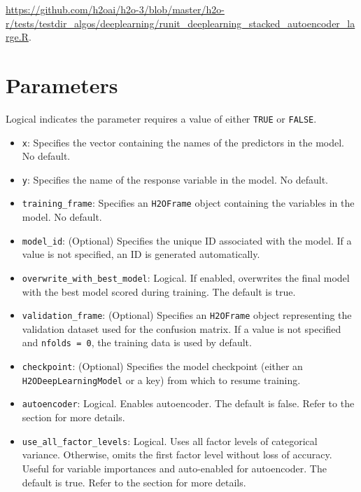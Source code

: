 {{\url{https://github.com/h2oai/h2o-3/blob/master/h2o-r/tests/testdir_algos/deeplearning/runit_deeplearning_stacked_autoencoder_large.R}.


\section{Parameters}
\label{sec:Parameters}

Logical indicates the parameter requires a value of either \texttt{TRUE} or \texttt{FALSE}. 

\begin{itemize}

\item \texttt{x}: Specifies the vector containing the names of the predictors in the model. No default.

\item \texttt{y}: Specifies the name of the response variable in the model. No default.

\item \texttt{training\_frame}: Specifies an \texttt{H2OFrame} object containing the variables in the model.  No default.

\item \texttt{model\_id}: (Optional) Specifies the unique ID associated with the model. If a value is not specified, an ID is generated automatically. 

\item \texttt{overwrite\_with\_best\_model}: Logical. If enabled, overwrites the final model with the best model scored during training. The default is true.

\item \texttt{validation\_frame}: (Optional) Specifies an \texttt{H2OFrame} object representing the validation dataset used for the confusion matrix. If a value is not specified and \texttt{nfolds = 0}, the training data is used by default. 

\item \texttt{checkpoint}: (Optional) Specifies the model checkpoint (either an \\ \texttt{H2ODeepLearningModel} or a key) from which to resume training. 

\item \texttt{autoencoder}: Logical. Enables autoencoder. The default is false. Refer to the {\textbf{}} section for more details.

\item \texttt{use\_all\_factor\_levels}: Logical. Uses all factor levels of categorical variance. Otherwise, omits the first factor level without loss of accuracy. Useful for variable importances and auto-enabled for autoencoder.  The default is true. Refer to the {\textbf{}} section for more details.


\end{itemize}}}
